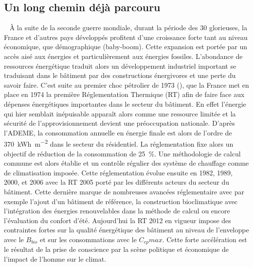 \subsection{Un long chemin déjà parcouru} %
\label{sub:un_long_chemin_deja_parcouru}
~
À la suite de la seconde guerre mondiale, durant la période des 30 glorieuses, la France
et d’autres pays développés profitent d’une croissance forte tant au niveau économique,
que démographique (baby-boom). Cette expansion est portée par un accès aisé aux énergies
et particulièrement aux énergies fossiles. L’abondance de ressources énergétique traduit
alors un développement industriel important se traduisant dans le bâtiment par des
constructions énergivores et une perte du savoir faire. C’est suite au premier choc
pétrolier de 1973 (), que la France met en place en 1974 la première
Réglementation Thermique (RT) afin de faire face aux dépenses énergétiques importantes
dans le secteur du bâtiment. En effet l’énergie qui hier semblait inépuisable apparaît
alors comme une ressource limitée et la sécurité de l’approvisionnement devient une
préoccupation nationale. D’après l’ADEME, la consommation annuelle en énergie finale est
alors de l’ordre de \SI{370}{kWh\per\metre\squared} dans le secteur du résidentiel. La
réglementation fixe alors un objectif de réduction de la consommation de
\SI{25}{\percent}. Une méthodologie de calcul commune est alors établie et
un contrôle régulier des système de chauffage comme de climatisation imposée.
Cette réglementation évolue ensuite en 1982, 1989, 2000, et 2006 avec la RT 2005 porté par
les différents acteurs du secteur du bâtiment. Cette dernière marque de nombreuses avancées
réglementaire avec par exemple l’ajout d’un bâtiment de référence, la construction bioclimatique
avec l’intégration des énergies renouvelables dans la méthode de calcul ou encore l’évaluation
du confort d’été.
Aujourd’hui la RT 2012 en vigueur impose
des contraintes fortes sur la qualité énergétique des bâtiment au niveau de l’enveloppe
avec le $B_{bio}$ et sur les consommations avec le $C_{ep} max$. Cette forte accélération
est le résultat de la prise de conscience par la scène politique et économique de l’impact de
l’homme sur le climat.

